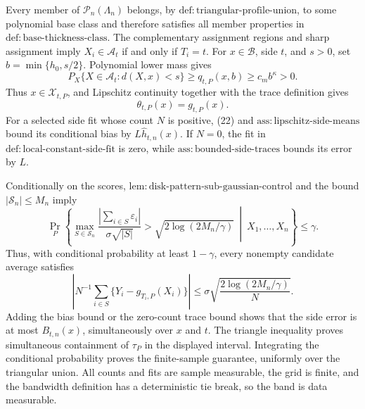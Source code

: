 Every member of \(\mathcal P_n(\Lambda_n)\) belongs, by \(\mathrm{def:triangular\text{-}profile\text{-}union}\), to some polynomial base class and therefore satisfies all member properties in \(\mathrm{def:base\text{-}thickness\text{-}class}\).  The complementary assignment regions and sharp assignment imply \(X_i\in\mathcal A_t\) if and only if \(T_i=t\).  For \(x\in\mathcal B\), side \(t\), and \(s>0\), set \(b=\min\{h_0,s/2\}\).  Polynomial lower mass gives
\[
 P_X\{X\in\mathcal A_t:d(X,x)<s\}
 \ge q_{t,P}(x,b)\ge c_mb^\kappa>0.
\]
Thus \(x\in\mathcal X_{t,P}\), and Lipschitz continuity together with the trace definition gives
\[
 \theta_{t,P}(x)=g_{t,P}(x). \tag{22}
\]
For a selected side fit whose count \(N\) is positive, (22) and \(\mathrm{ass:lipschitz\text{-}side\text{-}means}\) bound its conditional bias by \(L\widehat h_{t,n}(x)\).  If \(N=0\), the fit in \(\mathrm{def:local\text{-}constant\text{-}side\text{-}fit}\) is zero, while \(\mathrm{ass:bounded\text{-}side\text{-}traces}\) bounds its error by \(L\).

Conditionally on the scores, \(\mathrm{lem:disk\text{-}pattern\text{-}sub\text{-}gaussian\text{-}control}\) and the bound \(|\mathscr S_n|\le M_n\) imply
\[
 \Pr_P\left\{\max_{S\in\mathscr S_n}
 \frac{|\sum_{i\in S}\varepsilon_i|}{\sigma\sqrt{|S|}}
 >\sqrt{2\log(2M_n/\gamma)}
 \ \middle|\ X_1,\ldots,X_n\right\}\le\gamma. \tag{23}
\]
Thus, with conditional probability at least \(1-\gamma\), every nonempty candidate average satisfies
\[
 \left|N^{-1}\sum_{i\in S}\{Y_i-g_{T_i,P}(X_i)\}\right|
 \le\sigma\sqrt{\frac{2\log(2M_n/\gamma)}N}. \tag{24}
\]
Adding the bias bound or the zero-count trace bound shows that the side error is at most \(B_{t,n}(x)\), simultaneously over \(x\) and \(t\).  The triangle inequality proves simultaneous containment of \(\tau_P\) in the displayed interval.  Integrating the conditional probability proves the finite-sample guarantee, uniformly over the triangular union.  All counts and fits are sample measurable, the grid is finite, and the bandwidth definition has a deterministic tie break, so the band is data measurable.


